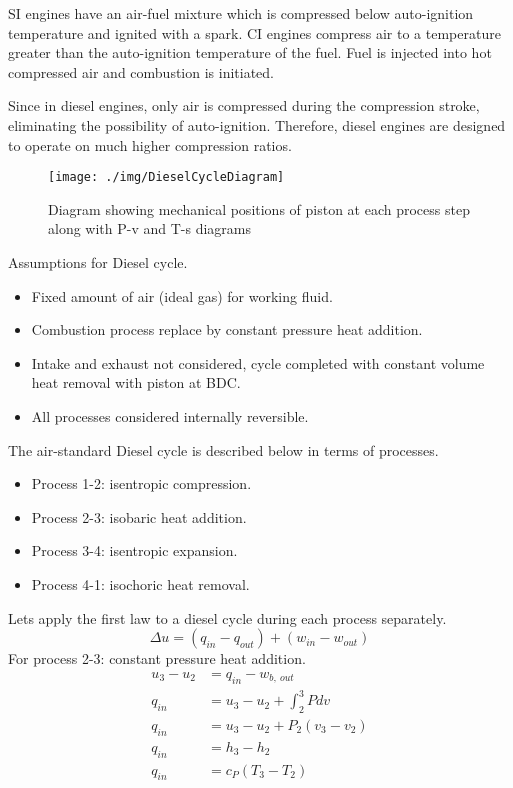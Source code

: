 SI engines have an air-fuel mixture which is compressed below auto-ignition temperature and ignited with a spark. CI engines compress air to a temperature greater than the auto-ignition temperature of the fuel. Fuel is injected into hot compressed air and combustion is initiated.

Since in diesel engines, only air is compressed during the compression stroke, eliminating the possibility of auto-ignition. Therefore, diesel engines are designed to operate on much higher compression ratios.
\begin{figure}
  \centering
  \texttt{[image: ./img/DieselCycleDiagram]}
  \caption{Diagram showing mechanical positions of piston at each process step along with P-v and T-s diagrams}
\end{figure}
Assumptions for Diesel cycle.
\begin{itemize}[noitemsep]
  \item Fixed amount of air (ideal gas) for working fluid.
  \item Combustion process replace by constant pressure heat addition.
  \item Intake and exhaust not considered, cycle completed with constant volume heat removal with piston at BDC.
  \item All processes considered internally reversible.
\end{itemize}
The air-standard Diesel cycle is described below in terms of processes.
\begin{itemize}[noitemsep]
  \item Process 1-2: isentropic compression.
  \item Process 2-3: isobaric heat addition.
  \item Process 3-4: isentropic expansion.
  \item Process 4-1: isochoric heat removal.
\end{itemize}
Lets apply the first law to a diesel cycle during each process separately.
\begin{equation}
  \Delta u = (q_{in} - q_{out}) + (w_{in}- w_{out})
\end{equation}
For process 2-3: constant pressure heat addition.
\begin{align}
  u_3 - u_2 & = q_{in} - w_{b, \ out}       \\
  q_{in}    & = u_3 - u_2 + \int_2^3 P dv   \\
  q_{in}    & = u_3 - u_2 + P_2 (v_3 - v_2) \\
  q_{in}    & = h_3 - h_2                   \\
  q_{in}    & = c_P (T_3 - T_2)
\end{align}
